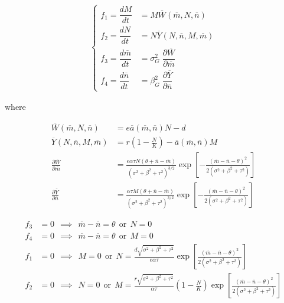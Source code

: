 \documentclass[10pt]{beamer}
\begin{document}
\begin{align}
	\begin{cases}
		f_1 = \dfrac{dM}{dt} &= M \overline{W}(\overline{m}, N, \overline{n}) \\[.25cm]
		f_2 = \dfrac{dN}{dt} &= N \overline{Y}(N, \overline{n}, M, \overline{m}) \\[.25cm]
		f_3 = \dfrac{d\overline{m}}{dt} &= \sigma_{G}^2 \; \dfrac{\partial \overline{W}}{\partial \overline{m}} \\[.25cm]
		f_4 = \dfrac{d\overline{n}}{dt} &= \beta_{G}^2 \; \dfrac{\partial \overline{Y}}{\partial \overline{n}}
	\end{cases}
\end{align}

\noindent where

\begin{align*}
	\overline{W}(\overline{m}, N, \overline{n}) &= e\overline{a}(\overline{m}, \overline{n})N - d \\
	\overline{Y}(N, \overline{n}, M, \overline{m}) &= r \left(1 - \frac{N}{K} \right) - \overline{a}(\overline{m}, \overline{n}) M \\
	\frac{\partial \overline{W}}{\partial \overline{m}} &= \frac{e\alpha\tau N(\theta + \overline{n} - \overline{m})}{(\sigma^2 + \beta^2 + \tau^2)^{3/2}} \exp\left[{-\frac{(\overline{m} - \overline{n} - \theta)^2}{2(\sigma^2 + \beta^2 + \tau^2)}}\right]\\
	\frac{\partial \overline{Y}}{\partial \overline{n}} &= \frac{\alpha\tau M(\theta + \overline{n} - \overline{m})}{(\sigma^2 + \beta^2 + \tau^2)^{3/2}} \exp\left[{-\frac{(\overline{m} - \overline{n} - \theta)^2}{2(\sigma^2 + \beta^2 + \tau^2)}}\right]
\end{align*}

\begin{align}
	f_3 &= 0 \ \ \implies \ \ \overline{m} - \overline{n} = \theta \ \ \text{or}\ \ N = 0 \\[.1cm]
	f_4 &= 0 \ \ \implies \ \ \overline{m} - \overline{n} = \theta \ \ \text{or}\ \ M = 0 \\[.1cm]
	f_1 &= 0 \ \ \implies \ \ M = 0 \ \ \text{or}\ \ N = \frac{d\sqrt{\sigma^2 + \beta^2 + \tau^2}}{e \alpha \tau}\exp\left[{\frac{(\overline{m} - \overline{n} - \theta)^2}{2(\sigma^2 + \beta^2 + \tau^2)}}\right] \\[.1cm]
	f_2 &= 0 \ \ \implies \ \ N = 0 \ \ \text{or}\ \ M = \frac{r\sqrt{\sigma^2 + \beta^2 + \tau^2}}{\alpha \tau}\left(1 - \frac{N}{K}\right)\exp\left[{\frac{(\overline{m} - \overline{n} - \theta)^2}{2(\sigma^2 + \beta^2 + \tau^2)}}\right]
\end{align}
\end{document}
